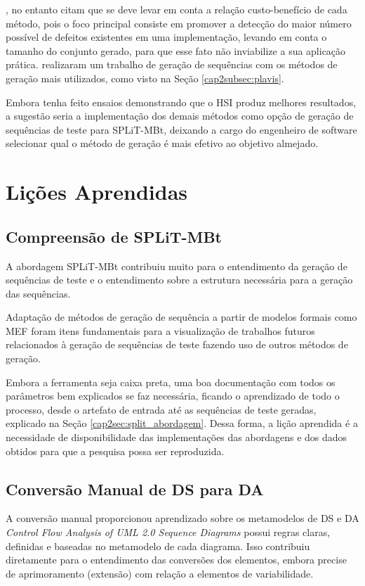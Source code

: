 \citet{pinheiro2012jplavisfsm}, no entanto citam que se deve levar em conta a relação custo-benefício de cada método, pois o foco principal consiste em promover a detecção do maior número possível de defeitos existentes em uma implementação, levando em conta o tamanho do conjunto gerado, para que esse fato não inviabilize a sua aplicação prática. \citet{pinheiro2012jplavisfsm} realizaram um trabalho de geração de sequências com os métodos de geração mais utilizados, como visto na Seção \ref{cap2subsec:plavis}.

Embora \citet{costa2016split} tenha feito ensaios demonstrando que o HSI produz melhores resultados, a sugestão seria a implementação dos demais métodos como opção de geração de sequências de teste para SPLiT-MBt, deixando a cargo do engenheiro de software selecionar qual o método de geração é mais efetivo ao objetivo almejado.

\section{Lições Aprendidas}
\label{cap5sec:licoes_aprendidas}
\subsection{Compreensão de SPLiT-MBt}
A abordagem SPLiT-MBt contribuiu muito para o entendimento da geração de sequências de teste e o entendimento sobre a estrutura necessária para a geração das sequências.

Adaptação de métodos de geração de sequência a partir de modelos formais como MEF foram itens fundamentais para a visualização de trabalhos futuros relacionados à geração de sequências de teste fazendo uso de outros métodos de geração.

Embora a ferramenta seja caixa preta, uma boa documentação com todos os parâmetros bem explicados se faz necessária, ficando o aprendizado de todo o processo, desde o artefato de entrada até as sequências de teste geradas, explicado na Seção \ref{cap2sec:split_abordagem}. Dessa forma, a lição aprendida é a necessidade de disponibilidade das implementações das abordagens e dos dados obtidos para que a pesquisa possa ser reproduzida.

\subsection{Conversão Manual de DS para DA}
A conversão manual proporcionou aprendizado sobre os metamodelos de DS e DA \textit{Control Flow Analysis of UML 2.0 Sequence Diagrams} possui regras claras, definidas e baseadas no metamodelo de cada diagrama. Isso contribuiu diretamente para o entendimento das conversões dos elementos, embora precise de aprimoramento (extensão) com relação a elementos de variabilidade.

